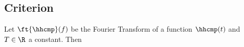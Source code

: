 \subsection{Criterion}
\begin{theorem}
\label{thm:mdb_zeroISI}
Let $\ft{\hhcmp}(f)$ be the Fourier Transform of a function
$\hhcmp(t)$ and $T\in\R$ a constant.
Then


\end{theorem}
